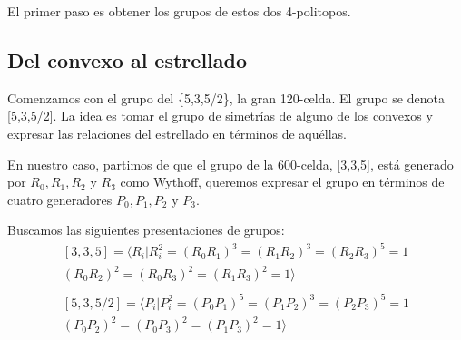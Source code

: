 \documentclass[spanish]{article}
\theoremstyle{definition}
\begin{document}
	El primer paso es obtener los grupos de estos dos 4-politopos.
	
	\subsection{Del convexo al estrellado}
	Comenzamos con el grupo del \{5,3,5/2\}, la gran 120-celda. El grupo se denota [5,3,5/2]. La idea es tomar el grupo de simetrías de alguno de los convexos y expresar las relaciones del estrellado en términos de aquéllas.
	
	En nuestro caso, partimos de que el grupo de la 600-celda, [3,3,5], está generado por $R_0,R_1,R_2$ y $R_3$ como Wythoff, queremos expresar el grupo en términos de cuatro generadores $P_0,P_1,P_2$ y $P_3$.
	
	Buscamos las siguientes presentaciones de grupos:
	\begin{align*}\label{rels}
		[3,3,5]=\langle R_i|R_i^2=(R_0R_1)^3=(R_1R_2)^3=(R_2R_3)^5=1\\
		(R_0R_2)^2=(R_0R_3)^2=(R_1R_3)^2=1\rangle\\ \\
		[5,3,5/2]=\langle P_i|P_i^2=(P_0P_1)^5=(P_1P_2)^3=(P_2P_3)^5=1\\
		(P_0P_2)^2=(P_0P_3)^2=(P_1P_3)^2=1\rangle
	\end{align*}
	
\end{document}
